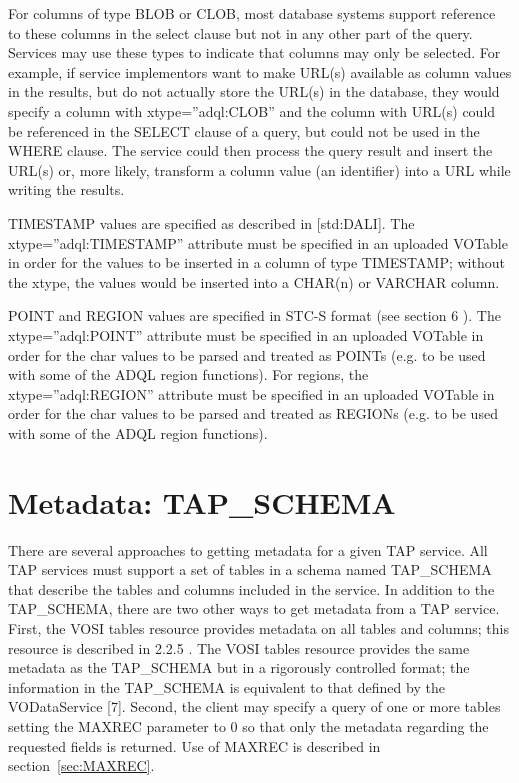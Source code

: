 \documentclass[11pt,letter]{ivoa}
\begin{document}
{For columns of type BLOB or CLOB, most database systems support reference to 
these columns in the select clause but not in any other part of the query. 
Services may use these types to indicate that columns may only be selected. For 
example, if service implementors want to make URL(s) available as column values 
in the results, but do not actually store the URL(s) in the database, they would 
specify a column with xtype=”adql:CLOB” and the column with URL(s) could be 
referenced in the SELECT clause of a query, but could not be used in the WHERE 
clause. The service could then process the query result and insert the URL(s) 
or, more likely, transform a column value (an identifier) into a URL while 
writing the results.

TIMESTAMP values are specified as described in [std:DALI]. The 
xtype=”adql:TIMESTAMP” attribute must be specified in an uploaded VOTable in 
order for the values to be inserted in a column of type TIMESTAMP; without the 
xtype, the values would be inserted into a CHAR(n) or VARCHAR column.

POINT and REGION values are specified in STC-S format (see section 6 ). The 
xtype=”adql:POINT” attribute must be specified in an uploaded VOTable in order 
for the char values to be parsed and treated as POINTs (e.g. to be used with 
some of the ADQL region functions). For regions, the xtype=”adql:REGION” 
attribute must be specified in an uploaded VOTable in order for the char values 
to be parsed and treated as REGIONs (e.g. to be used with some of the ADQL 
region functions).

\section{Metadata: TAP\_SCHEMA}
\label{sec:tap-schema}

There are several approaches to getting metadata for a given TAP service. All 
TAP services must support a set of tables in a schema named 
TAP\_SCHEMA that describe the tables and columns included in the 
service. In addition to the TAP\_SCHEMA, there are two other ways 
to get metadata from a TAP service. First, the VOSI tables resource provides 
metadata on all tables and columns; this resource is described in 2.2.5 . The 
VOSI tables resource provides the same metadata as the TAP\_SCHEMA 
but in a rigorously controlled format; the information in the 
TAP\_SCHEMA is equivalent to that defined by the  VODataService 
[7]. Second, the client may specify a query of one or more tables setting the 
MAXREC parameter to 0 so that only the metadata regarding the requested fields 
is returned. Use of MAXREC is described in section~\ref{sec:MAXREC}.

}
\end{document}
